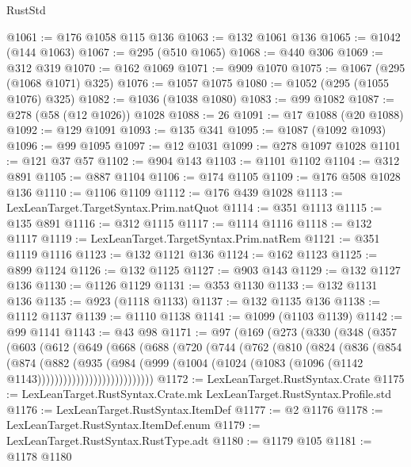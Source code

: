 \begin{lexlean}{RustStd}
\begin{coremodule}
@1061 := @176 @1058 @115 @136
@1063 := @132 @1061 @136
@1065 := @1042 (@144 @1063)
@1067 := @295 (@510 @1065)
@1068 := @440 @306
@1069 := @312 @319
@1070 := @162 @1069
@1071 := @909 @1070
@1075 := @1067 (@295 (@1068 @1071) @325)
@1076 := @1057 @1075
@1080 := @1052 (@295 (@1055 @1076) @325)
@1082 := @1036 (@1038 @1080)
@1083 := @99 @1082
@1087 := @278 (@58 (@12 @1026)) @1028
@1088 := 26
@1091 := @17 @1088 (@20 @1088)
@1092 := @129 @1091
@1093 := @135 @341
@1095 := @1087 (@1092 @1093)
@1096 := @99 @1095
@1097 := @12 @1031
@1099 := @278 @1097 @1028
@1101 := @121 @37 @57
@1102 := @904 @143
@1103 := @1101 @1102
@1104 := @312 @891
@1105 := @887 @1104
@1106 := @174 @1105
@1109 := @176 @508 @1028 @136
@1110 := @1106 @1109
@1112 := @176 @439 @1028
@1113 := LexLeanTarget.TargetSyntax.Prim.natQuot
@1114 := @351 @1113
@1115 := @135 @891
@1116 := @312 @1115
@1117 := @1114 @1116
@1118 := @132 @1117
@1119 := LexLeanTarget.TargetSyntax.Prim.natRem
@1121 := @351 @1119 @1116
@1123 := @132 @1121 @136
@1124 := @162 @1123
@1125 := @899 @1124
@1126 := @132 @1125
@1127 := @903 @143
@1129 := @132 @1127 @136
@1130 := @1126 @1129
@1131 := @353 @1130
@1133 := @132 @1131 @136
@1135 := @923 (@1118 @1133)
@1137 := @132 @1135 @136
@1138 := @1112 @1137
@1139 := @1110 @1138
@1141 := @1099 (@1103 @1139)
@1142 := @99 @1141
@1143 := @43 @98
@1171 := @97
    (@169
      (@273
        (@330
          (@348
            (@357
              (@603
                (@612
                  (@649
                    (@668
                      (@688
                        (@720
                          (@744
                            (@762
                              (@810
                                (@824
                                  (@836
                                    (@854
                                      (@874
                                        (@882
                                          (@935
                                            (@984
                                              (@999
                                                (@1004
                                                  (@1024
                                                    (@1083
                                                      (@1096 (@1142 @1143)))))))))))))))))))))))))))
@1172 := LexLeanTarget.RustSyntax.Crate
@1175 := LexLeanTarget.RustSyntax.Crate.mk LexLeanTarget.RustSyntax.Profile.std
@1176 := LexLeanTarget.RustSyntax.ItemDef
@1177 := @2 @1176
@1178 := LexLeanTarget.RustSyntax.ItemDef.enum
@1179 := LexLeanTarget.RustSyntax.RustType.adt
@1180 := @1179 @105
@1181 := @1178 @1180

\end{coremodule}
\end{lexlean}
